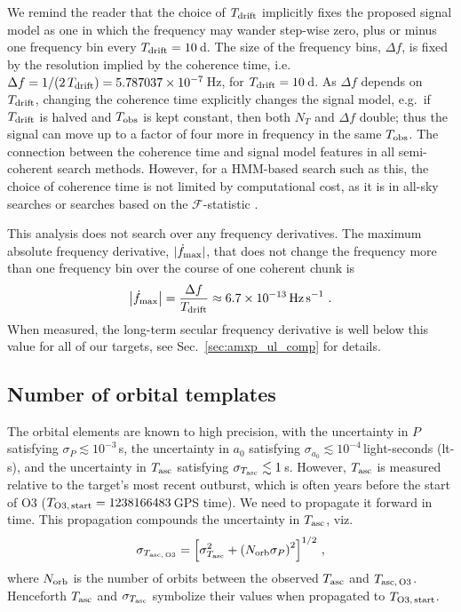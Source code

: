 We remind the reader that the choice of $T_{\textrm{drift}}$ implicitly fixes the proposed signal model as one in which the frequency may wander step-wise zero, plus or minus one frequency bin every $T_{\textrm{drift}}=10\,$d. The size of the frequency bins, $\Delta f$, is fixed by the resolution implied by the coherence time, i.e.~$\Delta f = 1 / (2\, T_{\textrm{drift}}) = 5.787037\times10^{-7}\,$Hz, for $T_{\textrm{drift}}=10\,$d. As $\Delta f$ depends on $T_{\textrm{drift}}$, changing the coherence time explicitly changes the signal model, e.g.~if $T_{\textrm{drift}}$ is halved and $T_{\rm obs}$ is kept constant, then both $N_T$ and $\Delta f$ double; thus the signal can move up to a factor of four more in frequency in the same $T_{\rm obs}$. The connection between the coherence time and signal model features in all semi-coherent search methods. However, for a HMM-based search such as this, the choice of coherence time is not limited by computational cost, as it is in all-sky searches or searches based on the $\mathcal{F}$-statistic \cite{o2allsky, Steltner2021}.

This analysis does not search over any frequency derivatives. The maximum absolute frequency derivative, $|\dot{f}_{\rm max}|$, that does not change the frequency more than one frequency bin over the course of one coherent chunk is
\begin{equation}
\left|\dot{f}_{\rm max} \right| = \frac{\Delta f}{T_{\textrm{drift}}} \approx 6.7\times 10^{-13}\,\textrm{Hz\,s}^{-1}\ .
\end{equation}
When measured, the long-term secular frequency derivative is well below this value for all of our targets, see Sec.~\ref{sec:amxp_ul_comp} for details.

\subsection{Number of orbital templates \label{sec:amxp_numtemps}}
The orbital elements are known to high precision, with the uncertainty in $P$ satisfying $\sigma_P \lesssim 10^{-3}\,$s, the uncertainty in $a_0$ satisfying $\sigma_{a_0} \lesssim 10^{-4}\,$light-seconds (lt-s), and the uncertainty in $T_{\textrm{asc}}$ satisfying $\sigma_{T_{\textrm{asc}}} \lesssim 1\,$s. However, $T_{\textrm{asc}}$ is measured relative to the target's most recent outburst, which is often years before the start of O3 ($T_{\rm O3,\,start}=1238166483\,$GPS time). We need to propagate it forward in time. This propagation compounds the uncertainty in $T_{\textrm{asc}}$, viz.~ \cite{o1crosscorSco, o2vitsco, Middleton2020}
\begin{equation}
\sigma_{T_{\rm asc,\,O3}} = \left[\sigma_{T_{\textrm{asc}}}^2 + \left(N_{\rm orb} \sigma_P\right)^2\right]^{1/2}\,, \label{eq:amxp_tascprop}
\end{equation}
where $N_{\rm orb}$ is the number of orbits between the observed $T_{\textrm{asc}}$ and $T_{\rm asc,\,O3}$. Henceforth $T_{\textrm{asc}}$ and $\sigma_{T_{\textrm{asc}}}$ symbolize their values when propagated to $T_{\rm O3,\,start}$.

